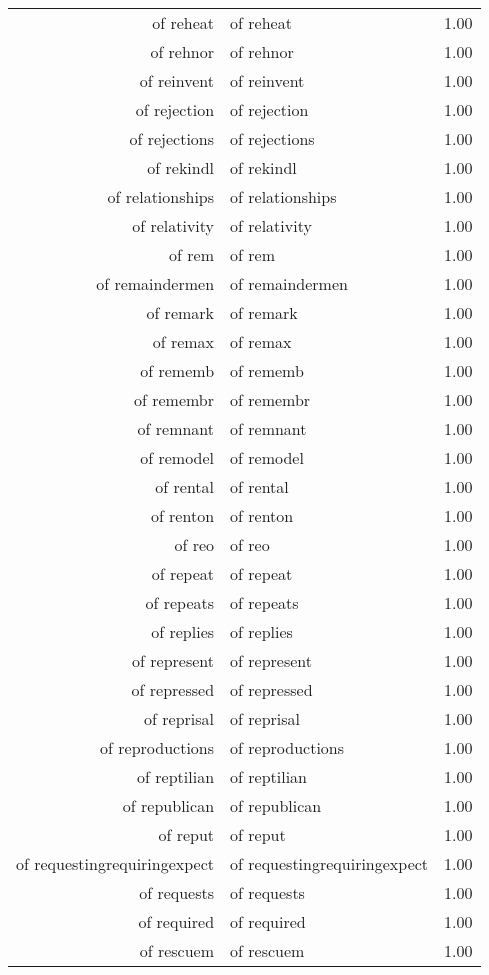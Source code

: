 \begin{table}[ht]
\begin{tabular}{rlr}
  of reheat & of reheat & 1.00 \\ 
  of rehnor & of rehnor & 1.00 \\ 
  of reinvent & of reinvent & 1.00 \\ 
  of rejection & of rejection & 1.00 \\ 
  of rejections & of rejections & 1.00 \\ 
  of rekindl & of rekindl & 1.00 \\ 
  of relationships & of relationships & 1.00 \\ 
  of relativity & of relativity & 1.00 \\ 
  of rem & of rem & 1.00 \\ 
  of remaindermen & of remaindermen & 1.00 \\ 
  of remark & of remark & 1.00 \\ 
  of remax & of remax & 1.00 \\ 
  of rememb & of rememb & 1.00 \\ 
  of remembr & of remembr & 1.00 \\ 
  of remnant & of remnant & 1.00 \\ 
  of remodel & of remodel & 1.00 \\ 
  of rental & of rental & 1.00 \\ 
  of renton & of renton & 1.00 \\ 
  of reo & of reo & 1.00 \\ 
  of repeat & of repeat & 1.00 \\ 
  of repeats & of repeats & 1.00 \\ 
  of replies & of replies & 1.00 \\ 
  of represent & of represent & 1.00 \\ 
  of repressed & of repressed & 1.00 \\ 
  of reprisal & of reprisal & 1.00 \\ 
  of reproductions & of reproductions & 1.00 \\ 
  of reptilian & of reptilian & 1.00 \\ 
  of republican & of republican & 1.00 \\ 
  of reput & of reput & 1.00 \\ 
  of requestingrequiringexpect & of requestingrequiringexpect & 1.00 \\ 
  of requests & of requests & 1.00 \\ 
  of required & of required & 1.00 \\ 
  of rescuem & of rescuem & 1.00 \\ 

\end{tabular}
\end{table}
